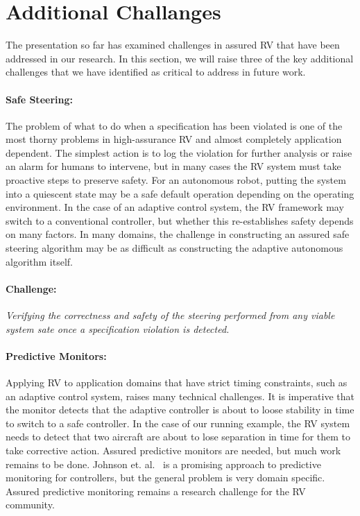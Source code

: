 \section{Additional Challanges }\label{sec:future} 
The presentation so far has examined challenges in assured RV that
have been addressed in our research. In this section, we will
raise three of the key additional challenges that we have identified
as critical to address in future work.

\paragraph{Safe Steering:} The problem of what to do when a
specification has been violated is one of the most thorny problems in
high-assurance RV and almost completely application dependent. The
simplest action is to log the violation for further analysis or raise
an alarm for humans to intervene, but in many cases the RV system must
take proactive steps to preserve safety. For an autonomous robot,
putting the system into a quiescent state may be a safe default
operation depending on the operating environment.  In the case of an
adaptive control system, the RV framework may switch to a conventional
controller, but whether this re-establishes safety depends on many
factors.  In many domains, the challenge in constructing an assured
safe steering algorithm may be as difficult as constructing the
adaptive autonomous algorithm itself.

\paragraph{Challenge:}  \emph{Verifying the correctness and safety of the
steering performed  from any viable system sate once a specification violation is detected.}
 

\paragraph{Predictive Monitors:} Applying RV to application domains
that have strict timing constraints, such as an adaptive control
system, raises many technical challenges.  It is imperative that the
monitor detects that the adaptive controller is about to loose
stability in time to switch to a safe controller. In the case of our
running example, the RV system needs to detect that two aircraft are
about to lose separation in time for them to take corrective action.
Assured predictive monitors are needed, but much work remains to be
done.  Johnson et. al.~\cite{johnson2015tecs} is a promising approach
to predictive monitoring for controllers, but the general problem is
very domain specific. Assured predictive monitoring remains a research
challenge for the RV community.

